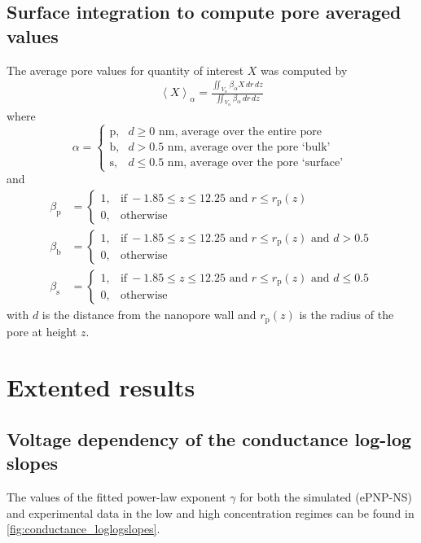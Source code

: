 \documentclass[journal=ancac3, manuscript=suppinfo, etalmode=truncate,maxauthors=0]{achemso}
\begin{document}
\subsection{Surface integration to compute pore averaged values}
The average pore values for quantity of interest $X$ was computed by
\begin{align}
  \left< X \right>_{\alpha} =
    \displaystyle\frac{\displaystyle\iint_{V_{\alpha}} \beta_{\alpha} X \,dr\,dz}
                      {\displaystyle\iint_{V_{\alpha}} \beta_{\alpha} \,dr\,dz}
\end{align}
where
\begin{equation}
  \alpha=
  \begin{cases}
    \text{p}, & d \ge 0  \text{~nm} \text{, average over the entire pore} \\
    \text{b}, & d > 0.5  \text{~nm} \text{, average over the pore `bulk' }  \\
    \text{s}, & d \le 0.5\text{~nm} \text{, average over the pore `surface' } 
  \end{cases}
\end{equation}
and
\begin{align}
  \beta_{\text{p}} &=
  \begin{cases}
    1, & \text{if}\ -1.85\le z \le 12.25  \text{ and } r \le r_\text{p}(z) \\
    0, & \text{otherwise}
  \end{cases} \\
  \beta_{\text{b}} &=
  \begin{cases}
  1, & \text{if}\ -1.85\le z \le 12.25  \text{ and } r \le r_\text{p}(z) \text{ and } d > 0.5 \\
  0, & \text{otherwise}
  \end{cases} \\
  \beta_{\text{s}} &=
  \begin{cases}
  1, & \text{if}\ -1.85\le z \le 12.25  \text{ and } r \le r_\text{p}(z) \text{ and } d \le 0.5 \\
  0, & \text{otherwise}
  \end{cases}
\end{align}
with $d$ is the distance from the nanopore wall and $r_\text{p}(z)$ is the radius of the pore at height $z$.




\section{Extented results}
\subsection{Voltage dependency of the conductance log-log slopes}
The values of the fitted power-law exponent $\gamma$ for both the simulated (ePNP-NS) and experimental data 
in the low and high concentration regimes can be found in \cref{fig:conductance_loglogslopes}.

\end{document}
